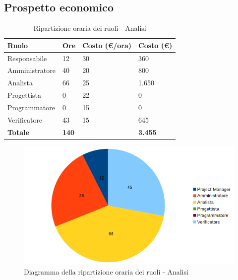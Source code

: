 \documentclass[12pt,a4paper]{article}
\begin{document}
\newpage
\subsection{Prospetto economico}

\begin{table}[h]
\begin{center}
\begin{tabular}{p{} p{} p{} p{}}
\toprule
\textbf{Ruolo}	& \textbf{Ore} & \textbf{Costo (\euro/ora)}	& \textbf{Costo (\euro)} \\
\midrule
\midrule
Responsabile & 12 & 30 & 360\\
\midrule
Amministratore & 40 & 20 & 800\\ 
\midrule
Analista & 66 & 25 & 1.650\\ 
\midrule
Progettista & 0 & 22 & 0\\ 
\midrule
Programmatore & 0 & 15 & 0\\ 
\midrule
Verificatore & 43 & 15 & 645\\ 
\midrule
\textbf{Totale} & \textbf{140} &  & \textbf{3.455}\\
\bottomrule
\end{tabular}
\caption{Ripartizione oraria dei ruoli - Analisi}
\end{center}
\end{table}

\begin{center}
\begin{figure}[H]
\centering
\includegraphics[width=\textwidth]{diagrammaTortaAnalisiTotaleOre.png}
\caption{Diagramma della ripartizione oraria dei ruoli - Analisi}
\end{figure}
\end{center}

\newpage
\end{document}
